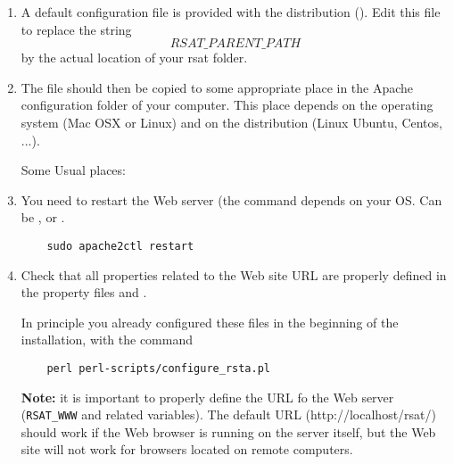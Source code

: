 \documentclass[12pt,a4paper, twoside]{scrreprt} %
\begin{document}
\begin{enumerate}
\item A default configuration file is provided with the \RSAT
  distribution (). Edit this file to
  replace the string \texttt{\[RSAT\_PARENT\_PATH\]} by the actual
  location of your rsat folder.
  
\item The file should then be copied to some appropriate place in the
  Apache configuration folder of your computer. This place depends on
  the operating system (Mac OSX or Linux) and on the distribution
  (Linux Ubuntu, Centos, ...).
  
  Some Usual places:
  
\item You need to restart the Web server (the command depends on your
  OS. Can be ,  or
  .

  \begin{lstlisting}
    sudo apache2ctl restart
  \end{lstlisting}

\item Check that all properties related to the Web site URL are
  properly defined in the \RSAT property files
   and
  . 

  In principle you already configured these files in the beginning of
  the installation, with the command
  \begin{lstlisting}
    perl perl-scripts/configure_rsta.pl
  \end{lstlisting}

  \textbf{Note:} it is important to properly define the URL fo the Web
  server (\texttt{RSAT\_WWW} and related variables). The default URL
  (http://localhost/rsat/) should work if the Web browser is running
  on the server itself, but the Web site will not work for browsers
  located on remote computers.

\end{enumerate}
\end{document}
